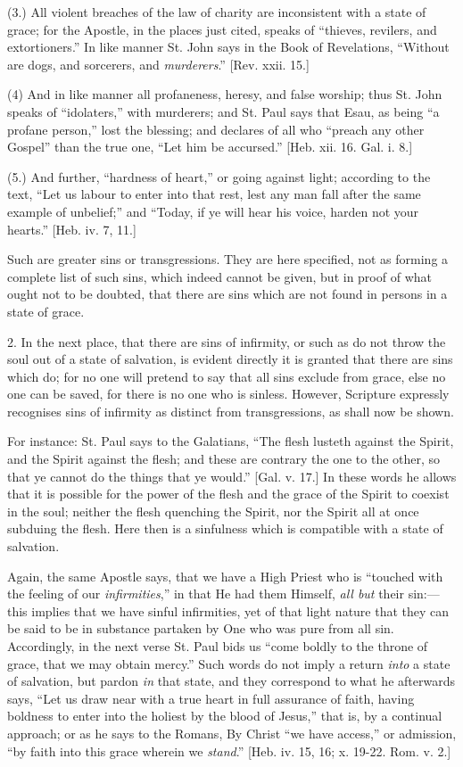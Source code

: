 (3.) All violent breaches of the law of charity are inconsistent
with a state of grace; for the Apostle, in the places just cited,
speaks of ``thieves, revilers, and extortioners.'' In like
manner St. John says in the Book of Revelations, ``Without are
dogs, and sorcerers, and \emph{murderers}.'' [Rev. xxii. 15.]

(4) And in like manner all profaneness, heresy, and false worship;
thus St. John speaks of ``idolaters,'' with murderers; and St.
Paul says that Esau, as being ``a profane person,'' lost the
blessing; and declares of all who ``preach any other Gospel''
than the true one, ``Let him be accursed.'' [Heb. xii. 16.
Gal. i. 8.]

(5.) And further, ``hardness of heart,'' or going against
light; according to the text, ``Let us labour to enter into that
rest, lest any man fall after the same example of unbelief;'' and
``Today, if ye will hear his voice, harden not your hearts.''
[Heb. iv. 7, 11.]

Such are greater sins or transgressions. They are here specified,
not as forming a complete list of such sins, which indeed cannot be
given, but in proof of what ought not to be doubted, that there are
sins which are not found in persons in a state of grace.

2. In the next place, that there are sins of infirmity, or such as
do not throw the soul out of a state of salvation, is evident directly
it is granted that there are sins which do; for no one will pretend to
say that all sins exclude from grace, else no one can be saved, for
there is no one who is sinless. However, Scripture expressly
recognises sins of infirmity as distinct from transgressions, as shall
now be shown.

For instance: St. Paul says to the Galatians, ``The flesh
lusteth against the Spirit, and the Spirit against the flesh; and
these are contrary the one to the other, so that ye cannot do the
things that ye would.'' [Gal. v. 17.] In these words he allows
that it is possible for the power of the flesh and the grace of the
Spirit to coexist in the soul; neither the flesh quenching the Spirit,
nor the Spirit all at once subduing the flesh. Here then is a
sinfulness which is compatible with a state of salvation.

Again, the same Apostle says, that we have a High Priest who is
``touched with the feeling of our \emph{infirmities},'' in
that He had them Himself, \emph{all but} their sin:—this implies
that we have sinful infirmities, yet of that light nature that they
can be said to be in substance partaken by One who was pure from all
sin. Accordingly, in the next verse St. Paul bids us ``come boldly
to the throne of grace, that we may obtain mercy.'' Such words do
not imply a return \emph{into} a state of salvation, but pardon \emph{in}
that state, and they correspond to what he afterwards says, ``Let
us draw near with a true heart in full assurance of faith, having
boldness to enter into the holiest by the blood of Jesus,'' that
is, by a continual approach; or as he says to the Romans, By Christ
``we have access,'' or admission, ``by faith into this
grace wherein we \emph{stand}.'' [Heb. iv. 15, 16; x. 19-22. Rom.
v. 2.]


